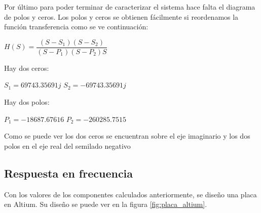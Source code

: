 

Por último para poder terminar de caracterizar el sistema hace falta el diagrama de polos y ceros. Los polos y ceros se obtienen fácilmente si reordenamos la función transferencia como se ve continuación:

\begin{center}
    $H(S) = \dfrac{(S-S_{1})(S-S_{2})}{(S-P_{1})(S-P_{2})S}$  \\
\end{center}

Hay dos ceros:
\begin{center}
    $S_{1}=69743.35691j $
    $S_{2}=-69743.35691j $
    \end{center}

Hay dos polos:

\begin{center}
    $P_{1}=-18687.67616$
    $P_{2}=-260285.7515$
\end{center}

Como se puede ver los dos ceros se encuentran sobre el eje imaginario y los dos polos en el eje real del semilado negativo


\begin{center}
    \end{center}

\subsection{Respuesta en frecuencia}
Con los valores de los componentes calculados anteriormente, se diseño una placa en Altium. Su diseño se 
puede ver en la figura \ref{fig:placa_altium}.

